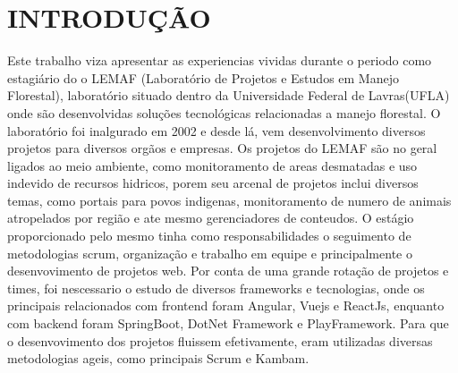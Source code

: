 \chapter{INTRODUÇÃO}

Este trabalho viza apresentar as experiencias vividas durante o periodo como estagiário do o LEMAF (Laboratório de Projetos e Estudos
em Manejo Florestal), laboratório situado dentro da Universidade Federal de Lavras(UFLA) onde são desenvolvidas soluções tecnológicas relacionadas a manejo florestal.
O laboratório foi inalgurado em 2002 e desde lá, vem desenvolvimento diversos projetos para diversos orgãos e empresas.
Os projetos do LEMAF são no geral ligados ao meio ambiente, como monitoramento de areas desmatadas e uso indevido de recursos hidricos, porem seu arcenal de projetos inclui diversos temas, como portais para povos indigenas, monitoramento de numero de animais atropelados por região e ate mesmo gerenciadores de conteudos.   
O estágio proporcionado pelo mesmo tinha como responsabilidades o seguimento de metodologias scrum, organização e trabalho em equipe e principalmente o desenvovimento de projetos web.
Por conta de uma grande rotação de projetos e times, foi nescessario o estudo de diversos frameworks e tecnologias, onde os principais relacionados com frontend foram Angular, Vuejs e ReactJs, enquanto com backend foram SpringBoot, DotNet Framework e PlayFramework.
Para que o desenvovimento dos projetos fluissem efetivamente, eram utilizadas diversas metodologias ageis, como principais Scrum e Kambam.
